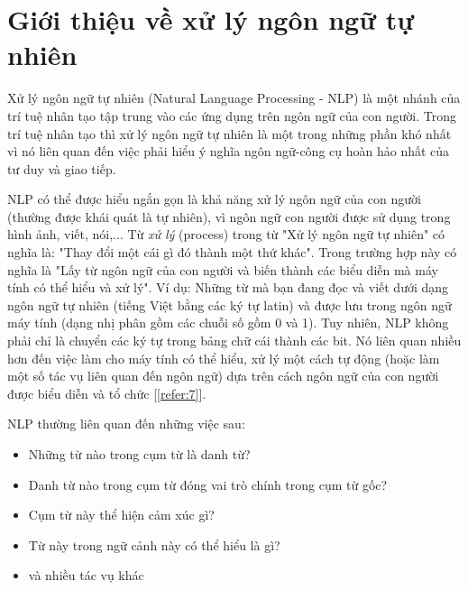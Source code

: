 \section{Giới thiệu về xử lý ngôn ngữ tự nhiên}
\label{sec:introduction_nlp}
Xử lý ngôn ngữ tự nhiên (Natural Language Processing - NLP) là một nhánh của trí tuệ nhân tạo tập trung vào các ứng dụng trên ngôn ngữ của con người. Trong trí tuệ nhân tạo thì xử lý ngôn ngữ tự nhiên là một trong những phần khó nhất vì nó liên quan đến việc phải hiểu ý nghĩa ngôn ngữ-công cụ hoàn hảo nhất của tư duy và giao tiếp.

NLP có thể được hiểu ngắn gọn là khả năng xử lý ngôn ngữ của con người (thường được khái quát là tự nhiên), vì ngôn ngữ con người được sử dụng trong hình ảnh, viết, nói,... Từ \emph{xử lý} (process) trong từ "Xử lý ngôn ngữ tự nhiên" có nghĩa là: "Thay đổi một cái gì đó thành một thứ khác". Trong trường hợp này có nghĩa là "Lấy từ ngôn ngữ của con người và biến thành các biểu diễn mà máy tính có thể hiểu và xử lý". Ví dụ: Những từ mà bạn đang đọc và viết dưới dạng ngôn ngữ tự nhiên (tiếng Việt bằng các ký tự latin) và được lưu trong ngôn ngữ máy tính (dạng nhị phân gồm các chuỗi số gồm 0 và 1). Tuy nhiên, NLP không phải chỉ là chuyển các ký tự trong bảng chữ cái thành các bit. Nó liên quan nhiều hơn đến việc làm cho máy tính có thể hiểu, xử lý một cách tự động (hoặc làm một số tác vụ liên quan đến ngôn ngữ) dựa trên cách ngôn ngữ của con người được biểu diễn và tổ chức [\ref{refer:7}].

NLP thường liên quan đến những việc sau:
\begin{itemize}
    \item Những từ nào trong cụm từ là danh từ?
    \item Danh từ nào trong cụm từ đóng vai trò chính trong cụm từ gốc?
    \item Cụm từ này thể hiện cảm xúc gì?
    \item Từ này trong ngữ cảnh này có thể hiểu là gì?
    \item và nhiều tác vụ khác
\end{itemize}

